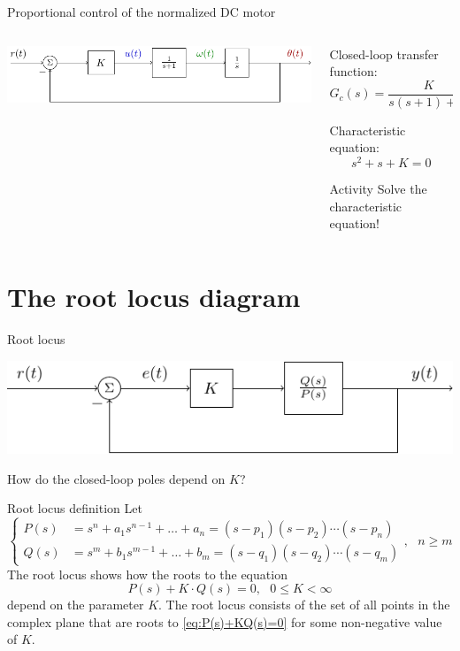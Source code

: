 \documentclass[presentation,aspectratio=169, usenames, dvipsnames]{beamer}
\begin{document}
\begin{frame}[label={sec:orge679d4d}]{Proportional control of the normalized DC motor}
\begin{columns}
\begin{column}{0.5\columnwidth}
\begin{center}
 \includegraphics[width=1.0\linewidth]{../../figures/block-DC-feedback}
\end{center}
\end{column}

\begin{column}{0.5\columnwidth}
Closed-loop transfer function:
\[ G_c(s) = \frac{K}{s(s+1) + K}\]

Characteristic equation:
\[ s^2 + s + K = 0\]

\alert{Activity} Solve the characteristic equation!
\end{column}
\end{columns}
\end{frame}

\section{The root locus diagram}
\label{sec:org4970f26}

\begin{frame}[label={sec:orgd41484a}]{Root locus}
\begin{center}
 \includegraphics[width=1.0\linewidth]{../../figures/block-rlocus}
\end{center}

\alert{How do the closed-loop poles depend on \(K\)?}
\end{frame}

\begin{frame}[label={sec:org9835fe2}]{Root locus definition}
Let
\[\begin{cases} P(s)&=s^n+a_1s^{n-1}+\dots+a_n = (s-p_1)(s-p_2)\cdots(s-p_n)\\ 
Q(s)&=s^m+b_1s^{m-1}+\dots+b_m=(s-q_1)(s-q_2)\cdots(s-q_m) \end{cases},\ \ \ n\ge m \]
The root locus shows how the roots to the equation
\begin{equation}
\label{eq:P(s)+KQ(s)=0}
P(s)+K\cdot Q(s)=0,\ \ \ 0\le K<\infty
\end{equation}
depend on the parameter \(K\). The root locus consists of the set of all points in the complex plane that are roots to \eqref{eq:P(s)+KQ(s)=0} for some non-negative value of \(K\).
\end{frame}
\end{document}
